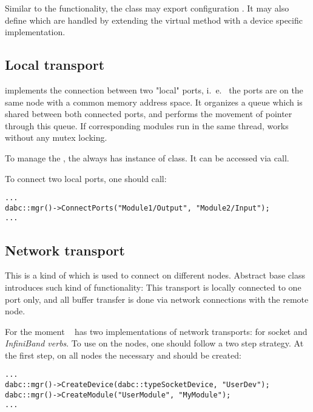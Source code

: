 Similar to the  functionality, the  class
may export configuration . It may also 
define  which are handled by extending the
virtual method  with a device specific
implementation.      
      

\subsection{Local transport}

 implements
the connection between two "local" ports,
i.~e.~ the ports are on the same node with a common memory address space.
It organizes a queue which is shared between both connected ports,
and performs the movement of  pointer through this queue.
If corresponding modules run in the same thread, 
 works without any mutex locking.

To manage the , the  always has instance of  class.
It can be accessed via  call. 

To connect two local ports, one should call:
\begin{small}
\begin{verbatim}
...
dabc::mgr()->ConnectPorts("Module1/Output", "Module2/Input");
...
\end{verbatim}     
\end{small}


\subsection{Network transport}

This is a kind of  which is used to 
connect  on different nodes.
Abstract base class  introduces such kind of 
functionality: This transport is locally connected  to one port only, 
and all buffer transfer is done
via network connections with the remote node. 

For the moment \dabc~ has two implementations of network transports: 
for socket and {\em InfiniBand verbs}.
To use  on the nodes, one should follow a two step strategy. 
At the first step, on all nodes the necessary  and  
should be created:
\begin{small}
\begin{verbatim}
...
dabc::mgr()->CreateDevice(dabc::typeSocketDevice, "UserDev");
dabc::mgr()->CreateModule("UserModule", "MyModule");
...
\end{verbatim}     
\end{small}

